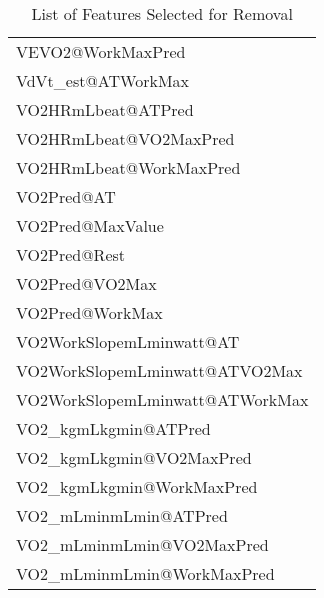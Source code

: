 \documentclass{article}
\begin{document}
\begin{table}[ht]
\begin{tabular}{|l|}
        VEVO2@WorkMaxPred               \\
        VdVt\_est@ATWorkMax             \\
        VO2HRmLbeat@ATPred              \\
        VO2HRmLbeat@VO2MaxPred          \\
        VO2HRmLbeat@WorkMaxPred         \\
        VO2Pred@AT                      \\
        VO2Pred@MaxValue                \\
        VO2Pred@Rest                    \\
        VO2Pred@VO2Max                  \\
        VO2Pred@WorkMax                 \\
        VO2WorkSlopemLminwatt@AT        \\
        VO2WorkSlopemLminwatt@ATVO2Max  \\
        VO2WorkSlopemLminwatt@ATWorkMax \\
        VO2\_kgmLkgmin@ATPred           \\
        VO2\_kgmLkgmin@VO2MaxPred       \\
        VO2\_kgmLkgmin@WorkMaxPred      \\
        VO2\_mLminmLmin@ATPred          \\
        VO2\_mLminmLmin@VO2MaxPred      \\
        VO2\_mLminmLmin@WorkMaxPred     \\
        \hline
    \end{tabular}
    \caption{List of Features Selected for Removal}
    \label{tab:features-to-remove}
\end{table}
\end{document}
